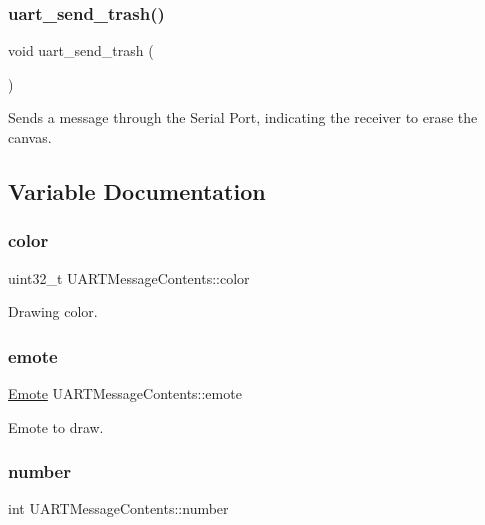 \subsubsection{\texorpdfstring{uart\+\_\+send\+\_\+trash()}{uart\_send\_trash()}}
{\footnotesize\ttfamily void uart\+\_\+send\+\_\+trash (\begin{DoxyParamCaption}{ }\end{DoxyParamCaption})}



Sends a message through the Serial Port, indicating the receiver to erase the canvas. 



\subsection{Variable Documentation}
\mbox{\label{group__uart__wordgame_gaf63ceb10b5565e8d603be982db362f98}} 
\subsubsection{\texorpdfstring{color}{color}}
{\footnotesize\ttfamily uint32\+\_\+t U\+A\+R\+T\+Message\+Contents\+::color}



Drawing color. 

\mbox{\label{group__uart__wordgame_ga91fba59102bf481eb5326e7ea57d1a2e}} 
\subsubsection{\texorpdfstring{emote}{emote}}
{\footnotesize\ttfamily \mbox{\hyperlink{group__emote_ga0e527855c554e31654c9beb340145574}{Emote}} U\+A\+R\+T\+Message\+Contents\+::emote}



Emote to draw. 

\mbox{\label{group__uart__wordgame_gab03c4fe8fde542d8614dcafe1789ac44}} 
\subsubsection{\texorpdfstring{number}{number}}
{\footnotesize\ttfamily int U\+A\+R\+T\+Message\+Contents\+::number}




